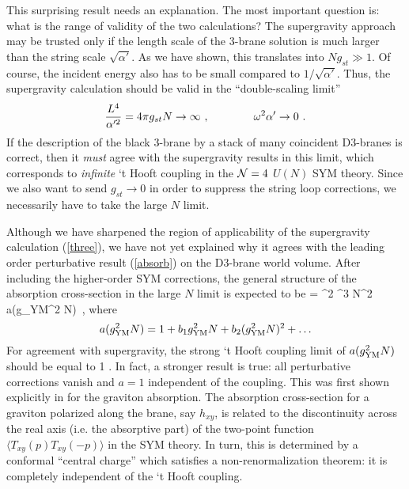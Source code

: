 \documentclass[12pt]{article}
\begin{document}
This surprising result needs an
explanation. The most important question is: what is the range of
validity of the two calculations? 
The supergravity approach may be trusted only if
the length scale of the 3-brane solution is much larger than the 
string scale $\sqrt{\alpha'}$. As we have shown, this translates into
$N g_{st} \gg 1$.
Of course, the incident energy also has
to be small compared to $1/\sqrt{\alpha'}$. 
Thus, the supergravity calculation should
be valid in the ``double-scaling limit'' \cite{kleb}
\begin{equation}
\label{dsl}
{L^4\over \alpha'^2} = 4\pi  g_{st} N \rightarrow \infty\ ,
\qquad\qquad \omega^2 \alpha' \rightarrow 0\ .
\end{equation}
If the description of the black 3-brane by a stack of
many coincident D3-branes is correct, 
then it {\it must} agree with the supergravity results in this limit,
which corresponds to {\it infinite} `t Hooft coupling in the  
${\cal N}=4$ $U(N)$ SYM theory. Since we also want to send $g_{st}
\rightarrow 0$ in order to suppress the string loop corrections,
we necessarily have to take the large $N$ limit.

Although we have sharpened the region of applicability of the
supergravity calculation (\ref{three}), we have not yet explained why
it agrees with the leading order perturbative result (\ref{absorb})
on the D3-brane world volume. 
After including the higher-order SYM corrections, the general structure
of the absorption cross-section in the large $N$ limit
is expected to be \cite{gkThree}
\be\label{newabsorb}
   \sigma = {\kappa^2  \omega^3 N^2 \pi} a(g_{\rm YM}^2 N)\ ,
 \ee
where
$$ a(g_{\rm YM}^2 N) = 1 + b_1 g_{\rm YM}^2 N + 
b_2 (g_{\rm YM}^2 N)^2 + \ldots
$$
For agreement with supergravity, the strong
`t Hooft coupling limit of $a(g_{\rm YM}^2 N)$ should be equal to 1 
\cite{gkThree}. In fact, a stronger result is true: all perturbative
corrections vanish and $a=1$ independent of the coupling.
This was first shown explicitly in \cite{gkThree} for the graviton
absorption. The absorption cross-section for a graviton polarized along
the brane, say $h_{xy}$, is related to the discontinuity across the
real axis (i.e. the absorptive part) of the two-point function
$\langle T_{xy} (p) T_{xy} (-p) \rangle$
in the SYM theory. In turn,
this is determined by a conformal ``central charge''
which satisfies a non-renormalization theorem: it is completely
independent of the `t Hooft coupling.
\end{document}
